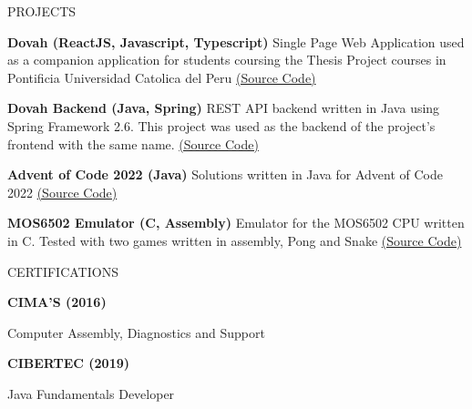 \documentclass{resume} %
\begin{document}
    \begin{rSection}{PROJECTS}
        \vspace{-1.25em}
        \item \textbf{Dovah (ReactJS, Javascript, Typescript)} {Single Page Web Application used as a companion application for students coursing the Thesis Project courses in Pontificia Universidad Catolica del Peru \href{https://github.com/PUCP-INF/Dovah-Frontend}{(Source Code)}}
        \item \textbf{Dovah Backend (Java, Spring)} {REST API backend written in Java using Spring Framework 2.6.
        This project was used as the backend of the project's frontend with the same name. \href{https://github.com/PUCP-INF/Dovah-Backend}{(Source Code)}}
        \item \textbf{Advent of Code 2022 (Java)} {Solutions written in Java for Advent of Code 2022 \href{https://github.com/csantv/AdventOfCode2022}{(Source Code)}}
        \item \textbf{MOS6502 Emulator (C, Assembly)} {Emulator for the MOS6502 CPU written in C. Tested with two games written in assembly, Pong and Snake \href{https://github.com/csantv/mos6502-emulator}{(Source Code)}}
    \end{rSection}

    \begin{rSection}{CERTIFICATIONS}
        \vspace{-1.25em}
        \item \textbf{CIMA'S (2016)}
        \item {Computer Assembly, Diagnostics and Support}
        \item \textbf{CIBERTEC (2019)}
        \item {Java Fundamentals Developer}
    \end{rSection}
\end{document}
